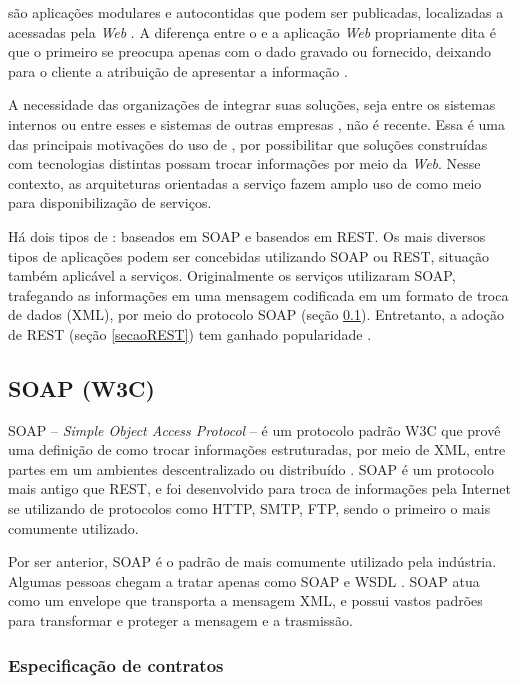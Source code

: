 \ws{} são aplicações modulares e autocontidas que podem ser publicadas,
localizadas a acessadas pela \textit{Web} \cite{alonso2004web}. A diferença
entre o \ws{} e a aplicação \textit{Web} propriamente dita é que o primeiro se
preocupa apenas com o dado gravado ou fornecido, deixando para o cliente a atribuição de apresentar a
informação \cite{serrano2014service}.

A necessidade das organizações de integrar suas soluções, seja
entre os sistemas internos ou entre esses e sistemas de outras empresas
\cite{rao2004survey}, não é recente. Essa é uma das principais motivações do uso
de \ws{}, por possibilitar que soluções construídas com tecnologias distintas
possam trocar informações por meio da \textit{Web}. Nesse contexto, as arquiteturas
orientadas a serviço fazem amplo uso de \ws{} como meio para disponibilização de serviços.

Há dois tipos de \ws{}: baseados em SOAP e baseados em REST. Os mais diversos
tipos de aplicações podem ser concebidas utilizando \wss{} SOAP ou REST,
situação também aplicável a serviços.
Originalmente os serviços utilizaram \ws{} SOAP, trafegando as informações em
uma mensagem codificada em um formato de troca de dados (XML), por meio do
protocolo SOAP (seção \ref{secaoSOAP}). Entretanto, a adoção de \ws{} REST
(seção \ref{secaoREST}) tem ganhado popularidade \cite{mumbaikar2013web}.

\subsection{SOAP (W3C) }
\label{secaoSOAP}
\vspace{-6mm}

SOAP -- \textit{Simple Object Access Protocol} -- é um protocolo padrão W3C que
provê uma definição de como trocar informações estruturadas, por meio de XML, entre
partes em um ambientes descentralizado ou distribuído \cite{WSDLSite}. SOAP é um
protocolo mais antigo que REST, e foi desenvolvido para troca de informações
pela Internet se utilizando de protocolos como HTTP, SMTP, FTP, sendo o primeiro
o mais comumente utilizado.

Por ser anterior, SOAP é o padrão de \ws{} mais comumente utilizado pela
indústria.
Algumas pessoas chegam a tratar \ws{} apenas como SOAP e WSDL
\cite{serrano2014service}. SOAP atua como um envelope que transporta a mensagem
XML, e possui vastos padrões para transformar e proteger a mensagem e a
trasmissão. 


\subsubsection{Especificação de contratos}
\vspace{-6mm}


